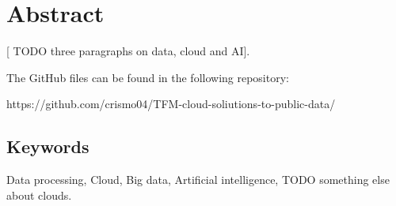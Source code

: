 \chapter*{Abstract}

  [ TODO three paragraphs on data, cloud and AI].


The GitHub files can be found in the following repository: 

    https://github.com/crismo04/TFM-cloud-soliutions-to-public-data/

\section*{Keywords}

\noindent Data processing, Cloud, Big data, Artificial intelligence, TODO something else about clouds.



